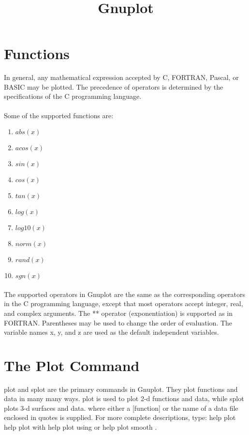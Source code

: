 \documentclass[12pt]{article}
\title{Gnuplot}
\begin{document}
\maketitle
\section{Functions}
\paragraph{}
In general, any mathematical expression accepted by C, FORTRAN, Pascal, or BASIC may be plotted. The precedence of operators is determined by the specifications of the C programming language.
\paragraph{}
Some of the supported functions are:
\begin{enumerate}
\item $abs(x)$
\item $acos(x)$
\item $sin(x)$
\item $cos(x)$
\item $tan(x)$
\item $log(x)$
\item $log10(x)$
\item $norm(x)$
\item $rand(x)$
\item $sgn(x)$
\end{enumerate}
\paragraph{}
The supported operators in Gnuplot are the same as the corresponding operators in the C programming language, except that most operators accept integer, real, and complex arguments. The ** operator (exponentiation) is supported as in FORTRAN. Parentheses may be used to change the order of evaluation. The variable names x, y, and z are used as the default independent variables.
\section{The Plot Command}
\paragraph{}
plot and splot are the primary commands in Gnuplot. They plot functions and data in many many ways. plot is used to plot 2-d functions and data, while splot plots 3-d surfaces and data.
where either a [function] or the name of a data file enclosed in quotes is supplied. For more complete descriptions, type: help plot help plot with help plot using or help plot smooth .
\end{document}
